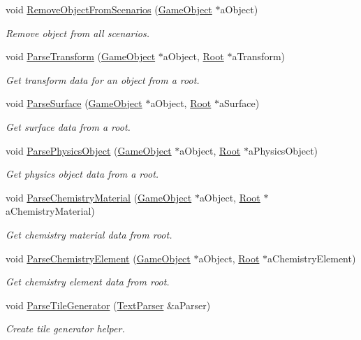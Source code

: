 \begin{DoxyCompactItemize}
void \hyperlink{classLevel_a741752f2e050d0c439d1cf068bd8df99}{Remove\+Object\+From\+Scenarios} (\hyperlink{classGameObject}{Game\+Object} $\ast$a\+Object)
\begin{DoxyCompactList}\small\item\em Remove object from all scenarios. \end{DoxyCompactList}\item 
void \hyperlink{classLevel_a90b6c18c5869a4a7325f1b2bf9939f77}{Parse\+Transform} (\hyperlink{classGameObject}{Game\+Object} $\ast$a\+Object, \hyperlink{classRoot}{Root} $\ast$a\+Transform)
\begin{DoxyCompactList}\small\item\em Get transform data for an object from a root. \end{DoxyCompactList}\item 
void \hyperlink{classLevel_af3c53f396a15fa70375aed02d973d71c}{Parse\+Surface} (\hyperlink{classGameObject}{Game\+Object} $\ast$a\+Object, \hyperlink{classRoot}{Root} $\ast$a\+Surface)
\begin{DoxyCompactList}\small\item\em Get surface data from a root. \end{DoxyCompactList}\item 
void \hyperlink{classLevel_a3b8c326fe2311aa2db22aab9ae702ef5}{Parse\+Physics\+Object} (\hyperlink{classGameObject}{Game\+Object} $\ast$a\+Object, \hyperlink{classRoot}{Root} $\ast$a\+Physics\+Object)
\begin{DoxyCompactList}\small\item\em Get physics object data from a root. \end{DoxyCompactList}\item 
void \hyperlink{classLevel_aef7b18107236b48c1428c8fbefb4bba7}{Parse\+Chemistry\+Material} (\hyperlink{classGameObject}{Game\+Object} $\ast$a\+Object, \hyperlink{classRoot}{Root} $\ast$a\+Chemistry\+Material)
\begin{DoxyCompactList}\small\item\em Get chemistry material data from root. \end{DoxyCompactList}\item 
void \hyperlink{classLevel_ad28f0d6a4c323efff6bceca6179222e8}{Parse\+Chemistry\+Element} (\hyperlink{classGameObject}{Game\+Object} $\ast$a\+Object, \hyperlink{classRoot}{Root} $\ast$a\+Chemistry\+Element)
\begin{DoxyCompactList}\small\item\em Get chemistry element data from root. \end{DoxyCompactList}\item 
void \hyperlink{classLevel_af19785d964f2abd088835f6fc6f916d9}{Parse\+Tile\+Generator} (\hyperlink{classTextParser}{Text\+Parser} \&a\+Parser)
\begin{DoxyCompactList}\small\item\em Create tile generator helper. \end{DoxyCompactList}\end{DoxyCompactItemize}
